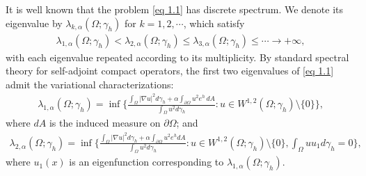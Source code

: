 \documentclass[11pt,leqno]{amsart}
\def\a{\alpha}
\def\l{\lambda}
\def\p{\partial}
\def \p {\partial}
\numberwithin{equation}{section}
\begin{document}
It is well known that the problem \eqref{eq 1.1} has discrete  spectrum. We  denote its eigenvalue by $\l_{k, \a}(\Omega; \gamma_h)$ for $k=1,2, \cdots$, which satisfy
  \begin{align*}
       \l_{1, \a}(\Omega;\gamma_h) < \l_{2, \a}(\Omega;\gamma_h)  \leq \l_{3, \a}(\Omega;\gamma_h) \leq \cdots \to +\infty,
    \end{align*}
with each eigenvalue repeated according to its multiplicity. 
By standard spectral theory for self-adjoint compact operators,  the first two eigenvalues of \eqref{eq 1.1} admit the variational characterizations: 
\begin{align}
     \lambda_{1,\alpha}(\Omega; \gamma_h)=\inf\{\frac{\int_{\Omega}|\nabla u|^{2}d\gamma_h+\alpha\int_{\partial \Omega}u^{2} e^{h}\, dA}{\int_{\Omega}u^{2}d\gamma_h}: u\in W^{1,2}(\Omega;\gamma_h)\setminus\{0\}\},
\end{align}
where $dA$ is  the
induced measure on $\p \Omega$;
and
\begin{align}\label{eq 1.3}
    \lambda_{2,\alpha}(\Omega;\gamma_h)=\inf\{\frac{\int_{\Omega}|\nabla u|^{2}d\gamma_h+\alpha\int_{\partial \Omega}u^{2} e^{h}dA}{\int_{\Omega}u^{2}d\gamma_h}: u\in W^{1,2}(\Omega;\gamma_h)\setminus\{0\}, \int_{\Omega}uu_{1}d\gamma_h=0\},
\end{align}
where $u_1(x)$ is an eigenfunction corresponding to $\l_{1, \a}(\Omega;\gamma_h)$. 
\end{document}

